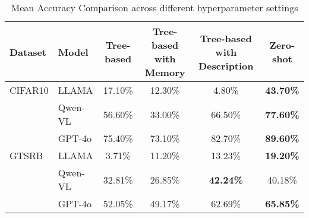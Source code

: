 \begin{table*}[ht]
\centering
\caption{Mean Accuracy Comparison across different hyperparameter settings}
\begin{tabular}{llcccc}
\hline
\textbf{Dataset} & \textbf{Model} & \textbf{Tree-based} & \textbf{Tree-based with Memory} & \textbf{Tree-based with Description} & \textbf{Zero-shot} \\ \hline
CIFAR10 & LLAMA & 17.10\% & 12.30\% & 4.80\% & \textbf{43.70\%} \\
      & Qwen-VL & 56.60\% & 33.00\% & 66.50\% & \textbf{77.60\%} \\
      & GPT-4o & 75.40\% & 73.10\% & 82.70\% & \textbf{89.60\%} \\
\hline
GTSRB & LLAMA & 3.71\% & 11.20\% & 13.23\% & \textbf{19.20\%} \\
      & Qwen-VL & 32.81\% & 26.85\% & \textbf{42.24\%} & 40.18\% \\
      & GPT-4o & 52.05\% & 49.17\% & 62.69\% & \textbf{65.85\%} \\
\hline
\end{tabular}
\label{tab:accuracy_comparison_hyperparams}
\end{table*}